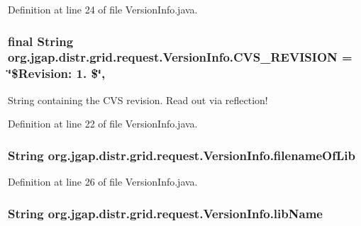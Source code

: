 Definition at line 24 of file Version\-Info.\-java.

\hypertarget{classorg_1_1jgap_1_1distr_1_1grid_1_1request_1_1_version_info_a25130a75a1287a12338297483a69f975}{
\subsubsection[{C\-V\-S\-\_\-\-R\-E\-V\-I\-S\-I\-O\-N}]{\setlength{\rightskip}{0pt plus 5cm}final String org.\-jgap.\-distr.\-grid.\-request.\-Version\-Info.\-C\-V\-S\-\_\-\-R\-E\-V\-I\-S\-I\-O\-N = \char`\"{}\$Revision\-: 1. \$\char`\"{}\hspace{0.3cm}{\ttfamily [static]}, {\ttfamily [private]}}}\label{classorg_1_1jgap_1_1distr_1_1grid_1_1request_1_1_version_info_a25130a75a1287a12338297483a69f975}
String containing the C\-V\-S revision. Read out via reflection! 

Definition at line 22 of file Version\-Info.\-java.

\hypertarget{classorg_1_1jgap_1_1distr_1_1grid_1_1request_1_1_version_info_a5a89c6eaf978c545b27d5fa045c0167c}{
\subsubsection[{filename\-Of\-Lib}]{\setlength{\rightskip}{0pt plus 5cm}String org.\-jgap.\-distr.\-grid.\-request.\-Version\-Info.\-filename\-Of\-Lib}}\label{classorg_1_1jgap_1_1distr_1_1grid_1_1request_1_1_version_info_a5a89c6eaf978c545b27d5fa045c0167c}


Definition at line 26 of file Version\-Info.\-java.

\hypertarget{classorg_1_1jgap_1_1distr_1_1grid_1_1request_1_1_version_info_a124e74f01d2cef6295942c18912e850a}{
\subsubsection[{lib\-Name}]{\setlength{\rightskip}{0pt plus 5cm}String org.\-jgap.\-distr.\-grid.\-request.\-Version\-Info.\-lib\-Name}}\label{classorg_1_1jgap_1_1distr_1_1grid_1_1request_1_1_version_info_a124e74f01d2cef6295942c18912e850a}


